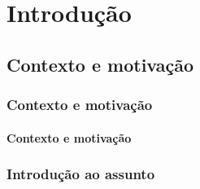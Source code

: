 \chapter{Introdução}

\section{Contexto e motivação}

\subsection{Contexto e motivação}

\subsubsection{Contexto e motivação}



\subsection{Introdução ao assunto}